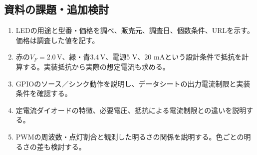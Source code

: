 \documentclass[lualatex,a4paper,10pt]{jlreq}
\begin{document}
\subsection{資料の課題・追加検討}
\begin{enumerate}
\item LEDの用途と型番・価格を調べ、販売元、調査日、個数条件、URLを示す。価格は調査した値を記す。
\item 赤の$V_F=2.0\,\mathrm{V}$、緑・青$3.4\,\mathrm{V}$、電源5 V、20 mAという設計条件で抵抗を計算する。実装抵抗から実際の想定電流も求める。
\item GPIOのソース／シンク動作を説明し、データシートの出力電流制限と実装条件を確認する。
\item 定電流ダイオードの特徴、必要電圧、抵抗による電流制限との違いを説明する。
\item PWMの周波数・点灯割合と観測した明るさの関係を説明する。色ごとの明るさの差も検討する。
\end{enumerate}
\end{document}
